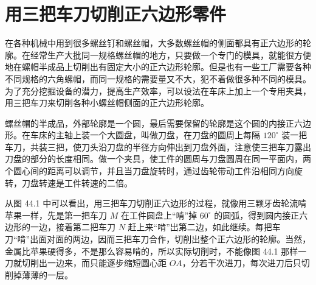 \section{用三把车刀切削正六边形零件}

在各种机械中用到很多螺丝钉和螺丝帽，大多数螺丝帽的侧面都具有正六边形的轮廓。在经常生产大批同一规格螺丝帽的地方，只要做一个专门的模具，就能很方便地在螺帽半成品上切削出有固定大小的正六边形轮廓。但是也有一些工厂需要各种不同规格的六角螺帽，而同一规格的需要量又不大，犯不着做很多种不同的模具。为了充分挖掘设备的潜力，提高生产效率，可以设法在车床上加上一个专用夹具，用三把车刀来切削各种小螺丝帽侧面的正六边形轮廓。

螺丝帽的半成品，外部轮廓是一个圆，最后需要保留的轮廓是这个圆的内接正六边形。在车床的主轴上装一个大圆盘，叫做刀盘，在刀盘的圆周上每隔 $120^\circ$ 装一把车刀，共装三把，使刀头沿刀盘的半径方向伸出到刀盘外面，注意使三把车刀露出刀盘的部分的长度相同。做一个夹具，使工件的圆周与刀盘圆周在同一平面内，两个圆心间的距离可以调节，并且当刀盘旋转时，通过齿轮带动工件沿相同方向旋转，刀盘转速是工件转速的二倍。

从图 44.1 中可以看出，用三把车刀切削正六边形的过程，就像用三颗牙齿轮流啃苹果一样，先是第一把车刀 $M$ 在工件圆盘上“啃”掉 $60^\circ$ 的圆弧，得到圆内接正六边形的一边，接着第二把车刀 $N$ 赶上来“啃”出第二边，如此继续。每把车刀“啃”出面对面的两边，因而三把车刀合作，切削出整个正六边形的轮廓。当然，金属比苹果硬得多，不是那么容易啃的，所以实际切削时，不能像图 44.1 那样一刀就切削出一边来，而只能逐步缩短圆心距 $OA$，分若干次进刀，每次进刀后只切削掉薄薄的一层。

